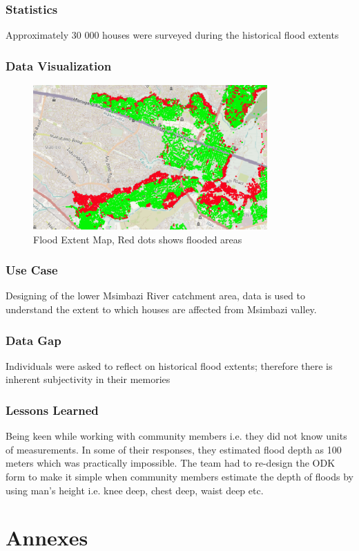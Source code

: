\documentclass[a4paper,12pt,twoside]{article}
\begin{document}
\subsubsection{Statistics}
Approximately 30 000 houses were surveyed during the historical flood extents


\subsubsection{Data Visualization}
\begin{figure}[h]
  \color{RHgreen}\caption{Flood Extent Map, Red dots shows flooded areas}
  \centering
  \includegraphics[width=0.8\textwidth]{images/Flood_Extent_Data_Viz.png}%
\end{figure}
\subsubsection{Use Case}
Designing of the lower Msimbazi River catchment area, data is used to understand the extent to which houses are affected from Msimbazi valley.

\subsubsection{Data Gap}
Individuals were asked to reflect on historical flood extents; therefore there is inherent subjectivity in their memories

\subsubsection{Lessons Learned}
Being keen while working with community members i.e. they did not know units of measurements. In some of their responses, they estimated flood depth as 100 meters which was practically impossible.
The team had to re-design the ODK form to make it simple when community members estimate the depth of floods by using man’s height i.e. knee deep, chest deep, waist deep etc.


\newpage
\section{Annexes}
\end{document}

